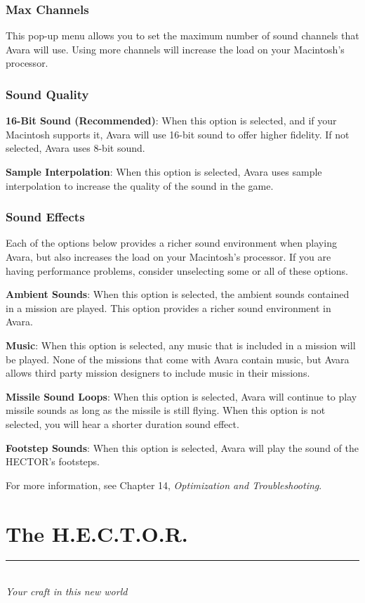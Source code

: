 \documentclass{article}
\let\oldsection\section
\renewcommand\section{\clearpage\oldsection}
\begin{document}
\subsubsection{Max Channels}
This pop-up menu allows you to set the maximum number of sound channels that Avara will use. Using more channels will increase the load on your Macintosh's processor.

\subsubsection{Sound Quality}
\textbf{16-Bit Sound (Recommended)}: When this option is selected, and if your Macintosh supports it, Avara will use 16-bit sound to offer higher fidelity. If not selected, Avara uses 8-bit sound.

\textbf{Sample Interpolation}: When this option is selected, Avara uses sample interpolation to increase the quality of the sound in the game.

\subsubsection{Sound Effects}
Each of the options below provides a richer sound environment when playing Avara, but also increases the load on your Macintosh's processor. If you are having performance problems, consider unselecting some or all of these options.

\textbf{Ambient Sounds}: When this option is selected, the ambient sounds contained in a mission are played. This option provides a richer sound environment in Avara.

\textbf{Music}: When this option is selected, any music that is included in a mission will be played. None of the missions that come with Avara contain music, but Avara allows third party mission designers to include music in their missions.

\textbf{Missile Sound Loops}: When this option is selected, Avara will continue to play missile sounds as long as the missile is still flying. When this option is not selected, you will hear a shorter duration sound effect.

\textbf{Footstep Sounds}: When this option is selected, Avara will play the sound of the HECTOR's footsteps.

For more information, see Chapter 14, \textit{Optimization and Troubleshooting}.


\section{The H.E.C.T.O.R.}
\rule{5.5cm}{.15pt}\\
\rmfamily\textit{Your craft in this new world}
\end{document}
